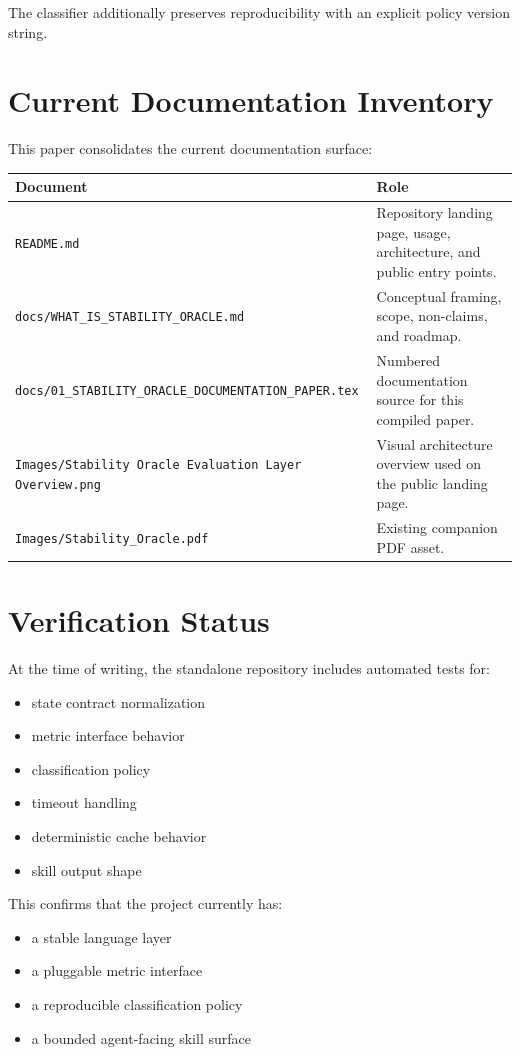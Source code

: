 \documentclass[11pt]{article}
\begin{document}
The classifier additionally preserves reproducibility with an explicit policy version string.

\section{Current Documentation Inventory}

This paper consolidates the current documentation surface:

\begin{tabular}{p{} p{}}
\textbf{Document} & \textbf{Role} \\
\hline
\texttt{README.md} & Repository landing page, usage, architecture, and public entry points. \\
\texttt{docs/WHAT\_IS\_STABILITY\_ORACLE.md} & Conceptual framing, scope, non-claims, and roadmap. \\
\texttt{docs/01\_STABILITY\_ORACLE\_DOCUMENTATION\_PAPER.tex} & Numbered documentation source for this compiled paper. \\
\texttt{Images/Stability Oracle Evaluation Layer Overview.png} & Visual architecture overview used on the public landing page. \\
\texttt{Images/Stability\_Oracle.pdf} & Existing companion PDF asset. \\
\end{tabular}

\section{Verification Status}

At the time of writing, the standalone repository includes automated tests for:

\begin{itemize}
\item state contract normalization
\item metric interface behavior
\item classification policy
\item timeout handling
\item deterministic cache behavior
\item skill output shape
\end{itemize}

This confirms that the project currently has:

\begin{itemize}
\item a stable language layer
\item a pluggable metric interface
\item a reproducible classification policy
\item a bounded agent-facing skill surface
\end{itemize}
\end{document}
